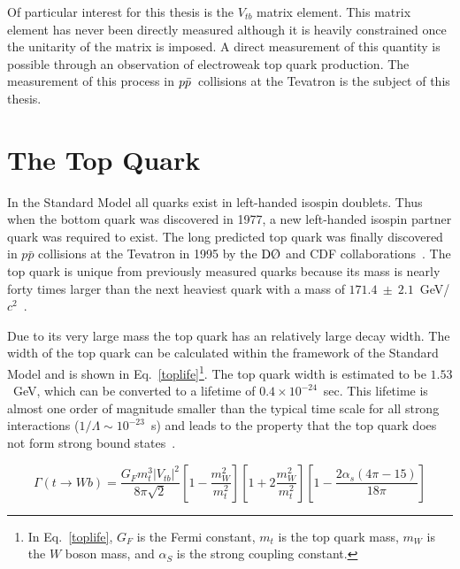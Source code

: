 Of particular interest for this thesis is the $V_{tb}$ matrix element. This matrix element has never been directly measured although it is heavily constrained once the unitarity of the matrix is imposed. A direct measurement of this quantity is possible through an observation of electroweak top quark production. The measurement of this process in $\mbox{$p\bar{p}$}$~collisions at the Tevatron is the subject of this thesis.

\section{The Top Quark}
\label{topquark}

In the Standard Model all quarks exist in left-handed isospin doublets. Thus when the bottom quark was discovered in 1977, a new left-handed isospin partner quark was required to exist. The long predicted top quark was finally discovered in $p\bar{p}$ collisions at the Tevatron in 1995 by the $\dzero$ and CDF collaborations~\cite{Abe:1995hr,Abachi:1995iq}. The top quark is unique from previously measured quarks because its mass is nearly forty times larger than the next heaviest quark with a mass of $171.4~\pm~2.1$~GeV/$c^{2}$~\cite{Brubaker:2006xn}.

Due to its very large mass the top quark has an relatively large decay width. The width of the top quark can be calculated within the framework of the Standard Model and is shown in Eq.~\ref{toplife}\footnote{In Eq.~\ref{toplife}, $G_{F}$ is the Fermi constant, $m_{t}$ is the top quark mass, $m_{W}$ is the $W$ boson mass, and $\alpha_{S}$ is the strong coupling constant.}. The top quark width is estimated to be $1.53$~GeV, which can be converted to a lifetime of $0.4 \times 10^{-24}$~sec. This lifetime is almost one order of magnitude smaller than the typical time scale for all strong interactions ($1/\Lambda\sim10^{-23}$~s) and leads to the property that the top quark does not form strong bound states~\cite{Bigi:1986jk}.

\begin{equation}
\Gamma(t \rightarrow Wb) = \frac{G_{F}m_{t}^{3}|V_{tb}|^{2}}{8\pi\sqrt{2}} \left[1-\frac{m_{W}^{2}}{m_{t}^{2}}\right]\left[1+2\frac{m_{W}^{2}}{m_{t}^{2}}\right]\left[1-\frac{2\alpha_{s}(4\pi-15)}{18\pi}\right]
\label{toplife}
\end{equation}


